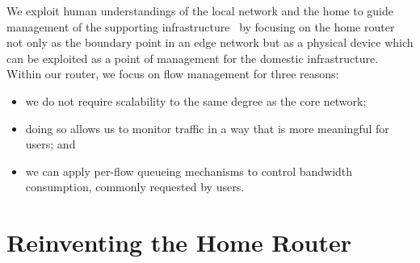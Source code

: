 We
exploit human understandings of the local network and the home to
guide management of the supporting
infrastructure~\cite{crabtree03:_findin_place_ubicom_home} by focusing
on the home router not only as the boundary point in an edge network
but as a physical device which can be exploited as a point of
management for the domestic infrastructure.  Within our router, we
focus on flow management for three reasons: 
\begin{itemize}
    \item we do not require
scalability to the same degree as the core network; 
    \item doing so
allows us to monitor traffic in a way that is more meaningful for
users; and 
\item we can apply per-flow queueing mechanisms to control
bandwidth consumption, commonly requested by users. 
\end{itemize}


\section{Reinventing the Home Router}
\label{s:router}
 
